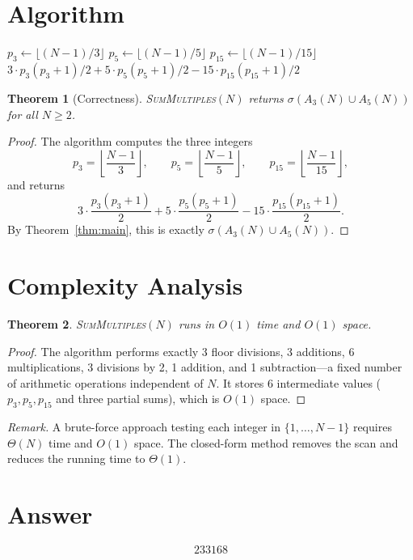 \documentclass[11pt]{article}
\newtheorem{theorem}{Theorem}
\begin{document}
\section{Algorithm}

\begin{algorithm}[H]
\caption{\textsc{SumMultiples}$(N)$}
\begin{algorithmic}[1]
\STATE $p_3 \gets \lfloor (N-1)/3 \rfloor$
\STATE $p_5 \gets \lfloor (N-1)/5 \rfloor$
\STATE $p_{15} \gets \lfloor (N-1)/15 \rfloor$
\RETURN $3 \cdot p_3(p_3+1)/2 + 5 \cdot p_5(p_5+1)/2 - 15 \cdot p_{15}(p_{15}+1)/2$
\end{algorithmic}
\end{algorithm}

\begin{theorem}[Correctness]
\textsc{SumMultiples}$(N)$ returns $\sigma(A_3(N) \cup A_5(N))$ for all $N \ge 2$.
\end{theorem}

\begin{proof}
The algorithm computes the three integers
\[
p_3 = \left\lfloor \frac{N-1}{3} \right\rfloor,\qquad
p_5 = \left\lfloor \frac{N-1}{5} \right\rfloor,\qquad
p_{15} = \left\lfloor \frac{N-1}{15} \right\rfloor,
\]
and returns
\[
3 \cdot \frac{p_3(p_3+1)}{2} + 5 \cdot \frac{p_5(p_5+1)}{2} - 15 \cdot \frac{p_{15}(p_{15}+1)}{2}.
\]
By Theorem~\ref{thm:main}, this is exactly $\sigma(A_3(N) \cup A_5(N))$.
\end{proof}

\section{Complexity Analysis}

\begin{theorem}
\textsc{SumMultiples}$(N)$ runs in $O(1)$ time and $O(1)$ space.
\end{theorem}

\begin{proof}
The algorithm performs exactly 3 floor divisions, 3 additions, 6 multiplications, 3 divisions by 2, 1 addition, and 1 subtraction---a fixed number of arithmetic operations independent of $N$. It stores 6 intermediate values ($p_3, p_5, p_{15}$ and three partial sums), which is $O(1)$ space.
\end{proof}

\emph{Remark.} A brute-force approach testing each integer in $\{1, \ldots, N-1\}$ requires $\Theta(N)$ time and $O(1)$ space. The closed-form method removes the scan and reduces the running time to $\Theta(1)$.

\section{Answer}

\[
\boxed{233168}
\]
\end{document}
